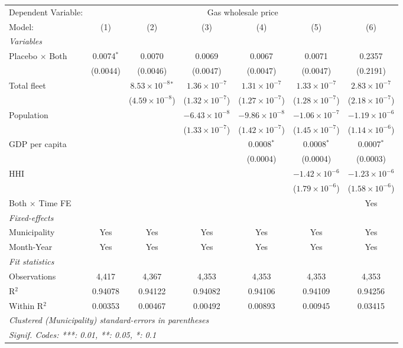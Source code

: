 \documentclass[
]{article}
\begin{document}
\begin{tabular}{lcccccc}
\tabularnewline\midrule\midrule
Dependent Variable:&\multicolumn{6}{c}{Gas wholesale price}\\
Model:&(1) & (2) & (3) & (4) & (5) & (6)\\
\midrule \emph{Variables}&   &   &   &   &   &  \\
Placebo $\times $ Both & 0.0074$^{*}$ & 0.0070 & 0.0069 & 0.0067 & 0.0071 & 0.2357\\
  &(0.0044) & (0.0046) & (0.0047) & (0.0047) & (0.0047) & (0.2191)\\
Total fleet &    & $8.53\times 10^{-8}$$^{*}$ & $1.36\times 10^{-7}$ & $1.31\times 10^{-7}$ & $1.33\times 10^{-7}$ & $2.83\times 10^{-7}$\\
  &   & ($4.59\times 10^{-8}$) & ($1.32\times 10^{-7}$) & ($1.27\times 10^{-7}$) & ($1.28\times 10^{-7}$) & ($2.18\times 10^{-7}$)\\
Population &    &    & $-6.43\times 10^{-8}$ & $-9.86\times 10^{-8}$ & $-1.06\times 10^{-7}$ & $-1.19\times 10^{-6}$\\
  &   &    & ($1.33\times 10^{-7}$) & ($1.42\times 10^{-7}$) & ($1.45\times 10^{-7}$) & ($1.14\times 10^{-6}$)\\
GDP per capita &    &    &    & 0.0008$^{*}$ & 0.0008$^{*}$ & 0.0007$^{*}$\\
  &   &    &    & (0.0004) & (0.0004) & (0.0003)\\
HHI &    &    &    &    & $-1.42\times 10^{-6}$ & $-1.23\times 10^{-6}$\\
  &   &    &    &    & ($1.79\times 10^{-6}$) & ($1.58\times 10^{-6}$)\\
Both $\times$ Time FE &  &  &  &  &  & Yes\\
\midrule \emph{Fixed-effects}&   &   &   &   &   &  \\
Municipality & Yes & Yes & Yes & Yes & Yes & Yes\\
Month-Year & Yes & Yes & Yes & Yes & Yes & Yes\\
\midrule \emph{Fit statistics}&  & & & & & \\
Observations & 4,417&4,367&4,353&4,353&4,353&4,353\\
R$^2$ & 0.94078&0.94122&0.94082&0.94106&0.94109&0.94256\\
Within R$^2$ & 0.00353&0.00467&0.00492&0.00893&0.00945&0.03415\\
\midrule\midrule\multicolumn{7}{l}{\emph{Clustered (Municipality) standard-errors in parentheses}}\\
\multicolumn{7}{l}{\emph{Signif. Codes: ***: 0.01, **: 0.05, *: 0.1}}\\
\end{tabular}
\end{document}
